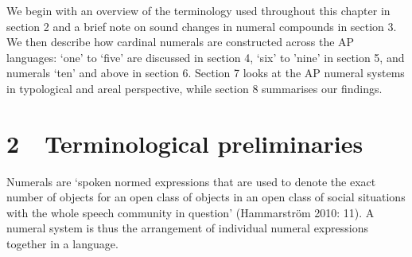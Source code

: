We begin with an overview of the terminology used throughout this chapter in section 2 and a brief note on sound changes in numeral compounds in section 3. We then describe how cardinal numerals are constructed across the AP languages: {\textquoteleft}one{\textquoteright} to {\textquoteleft}five{\textquoteright} are discussed in section 4, {\textquoteleft}six{\textquoteright} to {\textquoteright}nine{\textquoteright} in section 5, and numerals {\textquoteleft}ten{\textquoteright} and above in section 6. Section 7 looks at the AP numeral systems in typological and areal perspective, while section 8 summarises our findings.

\section[2\ \ Terminological preliminaries]{2\ \ Terminological preliminaries}
Numerals are {\textquoteleft}spoken normed expressions that are used to denote the exact number of objects for an open class of objects in an open class of social situations with the whole speech community in question{\textquoteright} (Hammarstr\"om 2010: 11). A numeral system is thus the arrangement of individual numeral expressions together in a language.

